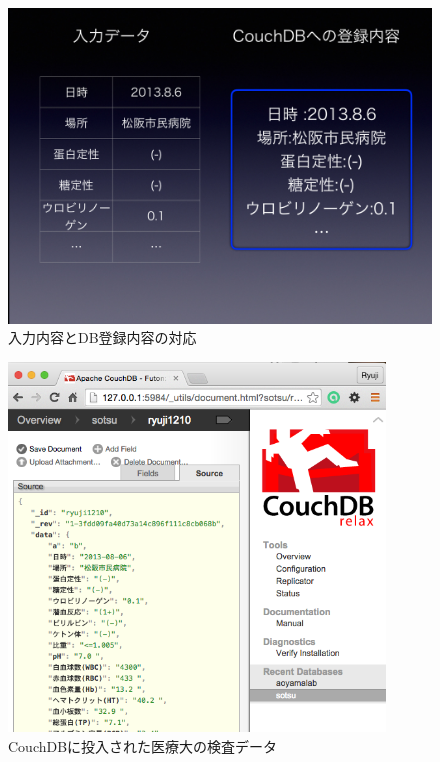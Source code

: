 			\begin{figure}[htbp]
				\begin{center}
					\includegraphics[width=15cm, bb=0 0 1435 1073, clip]{./gazou/csv-data-trans2.png}
				\end{center}
				\caption{入力内容とDB登録内容の対応}
				\label{csv-data-trans}
			\end{figure}

			\begin{figure}[htbp]
				\begin{center}
					\includegraphics[width=10cm, bb=0 0 581 571, clip]{./gazou/kensa-data.png}
				\end{center}
				\caption{CouchDBに投入された医療大の検査データ}
				\label{iryoudai-kensa-data}
			\end{figure}


